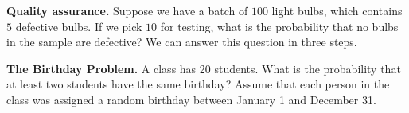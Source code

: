 \documentclass[answers,11pt]{exam}
\begin{document}
\begin{questions}
\begin{parts}
\end{parts}


\newpage

\question \textbf{Quality assurance.}  Suppose we have a batch of $100$ light bulbs,
which contains $5$ defective bulbs.  If we pick $10$ for testing, what is the
probability that no bulbs in the sample are defective?  We can answer this
question in three steps.



\question \textbf{The Birthday Problem.} A class has 20 students.  What is the probability that at least
two students have the same birthday?  Assume that each person in the class was
assigned a random birthday between January 1 and December 31.


\end{questions}
\end{document}
